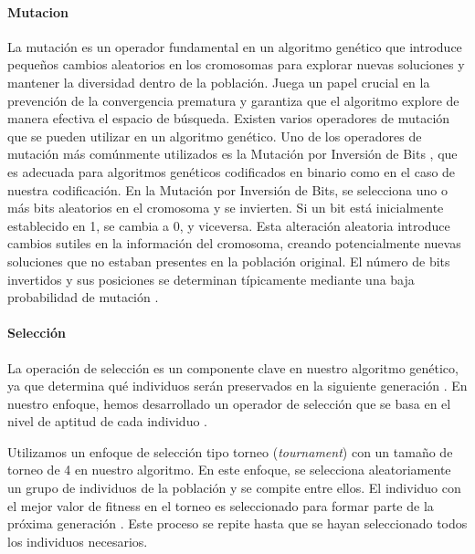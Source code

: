 \paragraph{Mutacion}

La mutación es un operador fundamental en un algoritmo genético que introduce
pequeños cambios aleatorios en los cromosomas para explorar nuevas soluciones
 y mantener la diversidad dentro de la población. Juega un
papel crucial en la prevención de la convergencia prematura 
y garantiza que el algoritmo explore de manera efectiva el espacio de búsqueda.
Existen varios operadores de mutación que se pueden utilizar en un algoritmo
genético. Uno de los operadores de mutación más comúnmente utilizados es la
Mutación por Inversión de Bits , que es adecuada para algoritmos genéticos codificados en binario como en el caso de nuestra codificación.
En la Mutación por Inversión de Bits, se selecciona uno o más bits aleatorios en
el cromosoma y se invierten. Si un bit está inicialmente establecido en 1, se
cambia a 0, y viceversa. Esta alteración aleatoria introduce cambios sutiles en
la información del cromosoma, creando potencialmente nuevas soluciones que no
estaban presentes en la población original. El número de bits invertidos y sus
posiciones se determinan típicamente mediante una baja probabilidad de mutación
.


\paragraph{Selección}
La operación de selección es un componente clave en nuestro algoritmo genético,
ya que determina qué individuos serán preservados en la siguiente generación
. En nuestro enfoque, hemos desarrollado un operador de
selección que se basa en el nivel de aptitud de cada individuo .

Utilizamos un enfoque de selección tipo torneo (\emph{tournament}) con un tamaño
de torneo de 4 en nuestro algoritmo. En este enfoque, se selecciona
aleatoriamente un grupo de individuos de la población y se  compite entre ellos. El individuo con el mejor valor de fitness en el
torneo es seleccionado para formar parte de la próxima generación . Este proceso se repite hasta que se hayan seleccionado todos los individuos necesarios.

